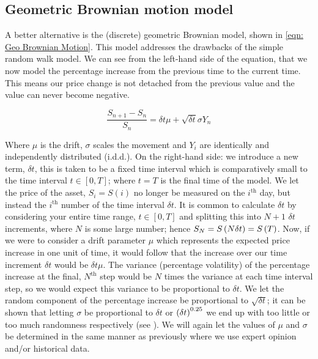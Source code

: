 \subsection{Geometric Brownian motion model}

A better alternative is the (discrete) geometric Brownian model, shown in \autoref{eqn: Geo Brownian Motion}. This model addresses the drawbacks of the simple random walk model. We can see from the left-hand side of the equation, that we now model the percentage increase from the previous time to the current time. This means our price change is not detached from the previous value and the  value can never become negative.

\begin{equation}\label{eqn: Geo Brownian Motion}
    \frac{S_{n+1} - S_n}{S_n} = \delta t\mu + \sqrt{\delta t}\sigma Y_{n}
\end{equation}

Where \(\mu \) is the drift, \(\sigma \) scales the movement and \(Y_i\) are identically and independently distributed (i.d.d.).
\nline{}
On the right-hand side: we introduce a new term, \(\delta t\), this is taken to be a fixed time interval which is comparatively small to the time interval \(t \in [0,T]\); where \(t = T\) is the final time of the model. We let the price of the asset, \(S_i = S(i)\) no longer be measured on the \(i^{\text{th}}\) day, but instead the \(i^{\text{th}}\) number of the time interval \(\delta t\). It is common to calculate \(\delta t\) by considering your entire time range, \(t\in[0,T]\) and splitting this into \(N + 1\) \(\delta t\) increments, where \(N\) is some large number; hence \(S_{N} = S\left(N\delta t\right) = S\left(T\right)\). Now, if we were to consider a drift parameter \(\mu \) which represents the expected price increase in one unit of time, it would follow that the increase over our time increment \(\delta t\) would be \(\delta t \mu \). The variance (percentage volatility) of the percentage increase at the final, \(N^{\text{th}}\) step would be \(N\) times the variance at each time interval step, so we would expect this variance to be proportional to \(\delta t\). We let the random component of the percentage increase be proportional to \(\sqrt{\delta t} \); it can be shown that letting \(\sigma \) be proportional to \(\delta t\) or \(\left(\delta t\right)^{0.25}\) we end up with too little or too much randomness respectively (see \cite{higham2004introduction}). We will again let the values of \( \mu \) and \(\sigma \) be determined in the same manner as previously where we use expert opinion and/or historical data.

